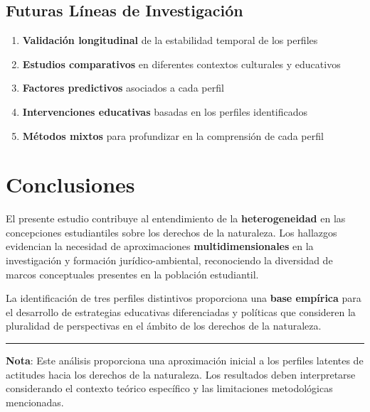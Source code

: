\documentclass[
  11pt,
  letterpaper,
  DIV=11,
  numbers=noendperiod]{scrartcl}
\providecommand{\tightlist}{%
  \setlength{\itemsep}{0pt}\setlength{\parskip}{0pt}}
\begin{document}
\subsection{Futuras Líneas de
Investigación}\label{futuras-luxedneas-de-investigaciuxf3n}

\begin{enumerate}
\def\labelenumi{\arabic{enumi}.}
\tightlist
\item
  \textbf{Validación longitudinal} de la estabilidad temporal de los
  perfiles
\item
  \textbf{Estudios comparativos} en diferentes contextos culturales y
  educativos
\item
  \textbf{Factores predictivos} asociados a cada perfil
\item
  \textbf{Intervenciones educativas} basadas en los perfiles
  identificados
\item
  \textbf{Métodos mixtos} para profundizar en la comprensión de cada
  perfil
\end{enumerate}

\section{Conclusiones}\label{conclusiones}

El presente estudio contribuye al entendimiento de la
\textbf{heterogeneidad} en las concepciones estudiantiles sobre los
derechos de la naturaleza. Los hallazgos evidencian la necesidad de
aproximaciones \textbf{multidimensionales} en la investigación y
formación jurídico-ambiental, reconociendo la diversidad de marcos
conceptuales presentes en la población estudiantil.

La identificación de tres perfiles distintivos proporciona una
\textbf{base empírica} para el desarrollo de estrategias educativas
diferenciadas y políticas que consideren la pluralidad de perspectivas
en el ámbito de los derechos de la naturaleza.

\begin{center}\rule{0.5\linewidth}{0.5pt}\end{center}

\textbf{Nota}: Este análisis proporciona una aproximación inicial a los
perfiles latentes de actitudes hacia los derechos de la naturaleza. Los
resultados deben interpretarse considerando el contexto teórico
específico y las limitaciones metodológicas mencionadas.
\end{document}
